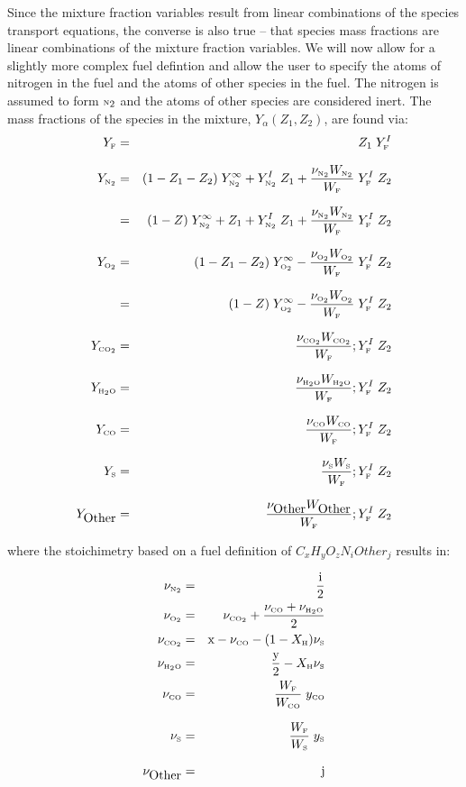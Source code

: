 \documentclass[11pt]{book}
\begin{document}
Since the mixture fraction variables result from linear combinations of the species transport equations, the converse
is also true -- that species mass fractions are linear combinations of the mixture fraction variables.  We will now allow
for a slightly more complex fuel defintion and allow the user to specify the atoms of nitrogen in the fuel and the atoms of
other species in the fuel.  The nitrogen is assumed to form ${\tiny \hbox{N}_2}$ and the atoms of other species are considered inert. 
The mass fractions of the species in the mixture, $Y_{\alpha}(Z_1,Z_2)$, are found via:
\begin{eqnarray}  Y_{\tiny \hbox{F}}     &=& Z_1 \; Y_{\tiny \hbox{F}}^I   \\*[.1in]
                  Y_{\tiny \hbox{N}_2}  &=& (1 - Z_1 - Z_2) \; Y_{\tiny \hbox{N}_2}^\infty + Y_{\tiny \hbox{N}_2}^I \; Z_1 + \frac{\nu_{\tiny \hbox{N}_2} W_{\tiny \hbox{N}_2}}{W_{\tiny \hbox{F}}} \; Y_{\tiny \hbox{F}}^I \; Z_2 \\*[.1in]
                           &=&  (1 - Z) \; Y_{\tiny \hbox{N}_2}^\infty + Z_1  + Y_{\tiny \hbox{N}_2}^I \; Z_1 + \frac{\nu_{\tiny \hbox{N}_2} W_{\tiny \hbox{N}_2}}{W_{\tiny \hbox{F}}} \; Y_{\tiny \hbox{F}}^I \; Z_2  \\*[.1in]
                  Y_{\tiny \hbox{O}_2}  &=& (1 - Z_1 - Z_2) \; Y_{\tiny \hbox{O}_2}^\infty - \frac{\nu_{\tiny \hbox{O}_2} W_{\tiny \hbox{O}_2}}{W_{\tiny \hbox{F}}} \; Y_{\tiny \hbox{F}}^I \; Z_2 \\*[.1in]
                           &=& (1 - Z) \; Y_{\tiny \hbox{O}_2}^\infty - \frac{\nu_{\tiny \hbox{O}_2} W_{\tiny \hbox{O}_2}}{W_{\tiny \hbox{F}}} \; Y_{\tiny \hbox{F}}^I \; Z_2 \\*[.1in]
                  Y_{\tiny \hbox{CO}_2} &=& \frac{\nu_{\tiny \hbox{CO}_2} W_{\tiny \hbox{CO}_2}}{W_{\tiny \hbox{F}}}; Y_{\tiny \hbox{F}}^I \; Z_2 \\*[.1in]
                  Y_{\tiny \hbox{H}_2\hbox{O}} &=& \frac{\nu_{\tiny \hbox{H}_2\hbox{O}} W_{\tiny \hbox{H}_2\hbox{O}}}{W_{\tiny \hbox{F}}}; Y_{\tiny \hbox{F}}^I \; Z_2 \\*[.1in]
                  Y_{\tiny \hbox{CO}}    &=& \frac{\nu_{\tiny \hbox{CO}} W_{\tiny \hbox{CO}}}{W_{\tiny \hbox{F}}}; Y_{\tiny \hbox{F}}^I \; Z_2  \\*[.1in]
                  Y_{\tiny \hbox{S}}     &=& \frac{\nu_{\tiny \hbox{S}} W_{\tiny \hbox{S}}}{W_{\tiny \hbox{F}}}; Y_{\tiny \hbox{F}}^I \; Z_2 \\*[.1in]
                  Y_{\hbox{Other}} &=& \frac{\nu_{\hbox{Other}} W_{\hbox{Other}}}{W_{\tiny \hbox{F}}}; Y_{\tiny \hbox{F}}^I \; Z_2     
\end{eqnarray}

where the stoichimetry based on a fuel definition of $C_x H_y O_z N_i Other_j$ results in:

\begin{eqnarray}  \nu_{\tiny \hbox{N}_2}  &=& \frac{\hbox{i}}{2}\\*[.in]
                  \nu_{\tiny \hbox{O}_2}  &=& \nu_{\tiny \hbox{CO}_2} + \frac{\nu_{\tiny \hbox{CO}}+\nu_{\tiny \hbox{H}_2\hbox{O}}}{2}\\*[.in]
                  \nu_{\tiny \hbox{CO}_2} &=& \hbox{x} - \nu_{\tiny \hbox{CO}} - (1-X_{\tiny \hbox{H}}) \nu_{\tiny \hbox{S}} \\*[.in]
                  \nu_{\tiny \hbox{H}_2\hbox{O}} &=& \frac{\hbox{y}}{2}- X_{\tiny \hbox{H}} \nu_{\tiny \hbox{S}}\\*[.in]
                  \nu_{\tiny \hbox{CO}}    &=& \frac{W_{\tiny \hbox{F}}}{W_{\tiny \hbox{CO}}} \; y_{\tiny \hbox{CO}} \\*[.1in]
                  \nu_{\tiny \hbox{S}}    &=& \frac{W_{\tiny \hbox{F}}}{W_{\tiny \hbox{S}}} \; y_{\tiny \hbox{S}} \\*[.1in]
                  \nu_{\hbox{Other}} &=& \hbox{j}
\end{eqnarray}
\end{document}
